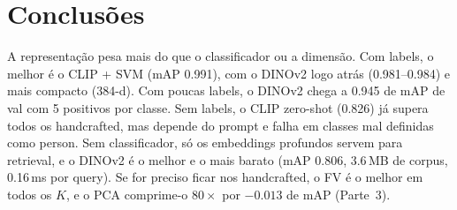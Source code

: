 \section{Conclusões}
\label{sec:conclusion}

A representação pesa mais do que o classificador ou a dimensão. Com labels, o
melhor é o CLIP + SVM (mAP 0.991), com o DINOv2 logo atrás (0.981--0.984) e
mais compacto (384-d). Com poucas labels, o DINOv2 chega a 0.945 de mAP de val
com 5 positivos por classe. Sem labels, o CLIP zero-shot (0.826) já supera
todos os handcrafted, mas depende do prompt e falha em classes mal definidas
como person. Sem classificador, só os embeddings profundos servem para
retrieval, e o DINOv2 é o melhor e o mais barato (mAP 0.806, 3.6\,MB de corpus,
0.16\,ms por query). Se for preciso ficar nos handcrafted, o FV é o melhor em
todos os $K$, e o PCA comprime-o $80\times$ por $-0.013$ de mAP (Parte~3).
